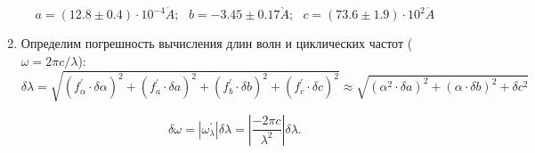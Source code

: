 \documentclass[a4paper,12pt]{article}
\renewcommand{\AA}{\ensuremath{\mathring{A}}}
\begin{document}
\begin{enumerate}
\begin{equation*}
    a = (12.8 \pm 0.4)\cdot 10^{-4} \AA; ~~~
    b = -3.45 \pm 0.17 \AA;~~~
c = (73.6 \pm 1.9)\cdot 10^{2} \AA
\end{equation*}
\item Определим погрешность вычисления длин волн и циклических частот ($\omega = 2\pi c/\lambda$):
\begin{equation*}
    \delta \lambda = \sqrt{(f_{\alpha}^{'}  \cdot \delta \alpha)^{2}+ (f^{'}_a \cdot \delta a)^{2} +(f^{'}_b\cdot \delta b)^{2} +(f^{'}_c \cdot \delta c)^{2}}  \approx  \sqrt{(\alpha^2 \cdot \delta a)^{2} +(\alpha \cdot\delta b)^{2} + \delta c^{2}}
\end{equation*}

\begin{equation*}
\delta \omega = |\omega_{\lambda}^{'} | \delta \lambda = \left|\frac{-2\pi c}{\lambda^2}\right |\delta \lambda.
\end{equation*}
\end{enumerate}
\end{document}
